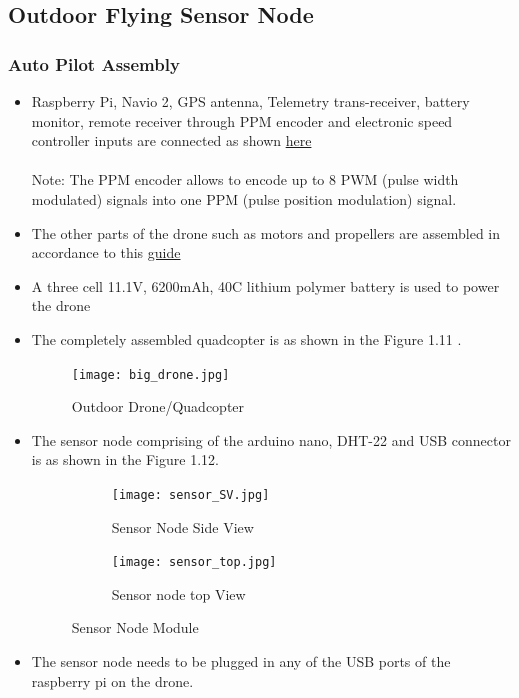 \documentclass[a4paper,12pt,oneside]{book}
\begin{document}
\subsection*{Outdoor Flying Sensor Node}
\subsubsection*{Auto Pilot Assembly}
\begin{itemize}
\item Raspberry Pi, Navio 2, GPS antenna, Telemetry trans-receiver, battery monitor, remote receiver through PPM encoder and electronic speed controller inputs are connected as shown \href{https://docs.emlid.com/navio2/ardupilot/hardware-setup/}{here} \\ \\
Note: The PPM encoder allows to encode up to 8 PWM (pulse width modulated) signals into one PPM (pulse position modulation) signal. 
\item The other parts of the drone such as motors and propellers are assembled in accordance to this \href{http://ardupilot.org/copter/docs/connect-escs-and-motors.html}{guide} 
\item A three cell 11.1V, 6200mAh, 40C lithium polymer battery is used to power the drone
\item The completely assembled quadcopter is as shown in the Figure 1.11 .
\begin{figure}[H]
\centering
\texttt{[image: big\_drone.jpg]}
\caption{Outdoor Drone/Quadcopter}
\end{figure}
\item The sensor node comprising of the arduino nano, DHT-22 and USB connector is as shown in the Figure 1.12.

\begin{figure}[H]
\centering
\begin{subfigure}{.6\textwidth}
  \centering
  \texttt{[image: sensor\_SV.jpg]}
  \caption{Sensor Node Side View}
  \label{fig:sub11}
\end{subfigure}%
\begin{subfigure}{.6\textwidth}
  \centering
  \texttt{[image: sensor\_top.jpg]}
  \caption{Sensor node top View}
  \label{fig:sub21}
\end{subfigure}
\caption{Sensor Node Module}
\label{fig:test1}
\end{figure}
\item The sensor node needs to be plugged in any of the USB ports of the raspberry pi on the drone.
\end{itemize}
\end{document}
